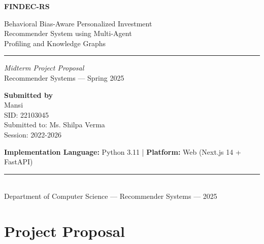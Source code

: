 \documentclass[12pt, a4paper]{article}
\begin{document}
\begin{titlepage}
\pagecolor{black}
\centering
\color{white}

\vspace*{1.5cm}
{\Huge\bfseries FINDEC-RS}
\vspace{0.7cm}

{\Large
Behavioral Bias-Aware Personalized Investment\\
Recommender System using Multi-Agent\\
Profiling and Knowledge Graphs}
\vspace{0.9cm}

{\color{white}\rule{10cm}{0.5pt}}
\vspace{0.9cm}

{\large \textit{Midterm Project Proposal}}\\[10pt]
{\normalsize Recommender Systems --- Spring 2025}

\vspace{1.8cm}

\begin{tcolorbox}[
  enhanced, width=10.5cm,
  colback=white, colframe=white,
  boxrule=0pt, arc=2pt,
  center,
  fontupper=\color{black}
]
  \centering
  {\bfseries\large Submitted by}\\[10pt]
  {\Huge Mansi}\\[10pt]
  {SID: 22103045}\\[8pt]
  {Submitted to: Ms. Shilpa Verma}\\[6pt]
  {Session: 2022-2026}
\end{tcolorbox}

\vspace{2cm}

{\small\color{white}
  \textbf{Implementation Language:} Python 3.11 \quad | \quad
  \textbf{Platform:} Web (Next.js 14 + FastAPI)
}

\vfill

{\color{white}\rule{10cm}{0.5pt}}\\[10pt]
{\small\color{white} Department of Computer Science --- Recommender Systems --- 2025}

\end{titlepage}

\newpage
\pagecolor{white}
\color{black}

\section{Project Proposal}
\end{document}
